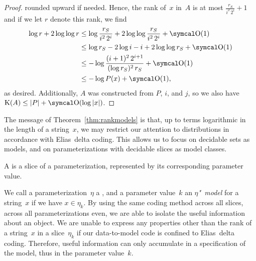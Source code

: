 \begin{proof}
  rounded upward if needed.
  Hence, the rank of~$x$ in~$A$ is at most $\frac{r_S}{i^2\, 2^i} + 1$ and if we let $r$ denote this rank, we find
  \begin{align*}
    \log r + 2 \log \log r &\le \log \frac{r_S}{i^2\, 2^i} + 2 \log \log \frac{r_S}{i^2\, 2^i} + \bigO(1) \\
    	&\le \log r_S - 2 \log i - i + 2 \log \log r_S + \bigO(1) \\
    	&\le -\log \frac{(i + 1)^2\, 2^{i + 1}}{(\log r_S)^2\, r_S} + \bigO(1) \\
    	&\le -\log P(x) + \bigO(1),
  \end{align*}
  as desired.
  Additionally, $A$ was constructed from $P$, $i$, and $j$, so we also have $\KC(A) \le \length{P} + \bigO(\log \length{x})$.
\end{proof}

The message of Theorem~\ref{thm:rankmodels} is that, up to terms logarithmic in the length of a string~$x$, we may restrict our attention to distributions in accordance with Elias~delta coding.
This allows us to focus on decidable sets as models, and on parameterizations with decidable slices as model classes.
\begin{definition}
  A  is a slice of a parameterization, represented by its corresponding parameter value.
\end{definition}

We call a parameterization~$\eta$ a , and a parameter value~$k$ an \emph{$\eta$"~model} for a string~$x$ if we have $x \in \eta_k$.
By using the same coding method across all slices, across all parameterizations even, we are able to isolate the useful information about an object.
We are unable to express any properties other than the rank of a string~$x$ in a slice~$\eta_k$ if our data-to-model code is confined to Elias~delta coding.
Therefore, useful information can only accumulate in a specification of the model, thus in the parameter value~$k$.

